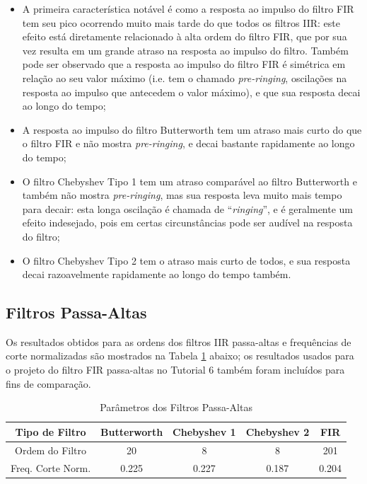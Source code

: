 \documentclass[a4paper,twoside,12pt]{article}
\begin{document}
	\begin{itemize}
		\item A primeira característica notável é como a resposta ao impulso do filtro FIR tem seu pico ocorrendo muito mais tarde do que todos os filtros IIR: este efeito está diretamente relacionado à alta ordem do filtro FIR, que por sua vez resulta em um grande atraso na resposta ao impulso do filtro. Também pode ser observado que a resposta ao impulso do filtro FIR é simétrica em relação ao seu valor máximo (i.e. tem o chamado \emph{pre-ringing}, oscilações na resposta ao impulso que antecedem o valor máximo), e que sua resposta decai ao longo do tempo;
		
		\item A resposta ao impulso do filtro Butterworth tem um atraso mais curto do que o filtro FIR e não mostra \emph{pre-ringing}, e decai bastante rapidamente ao longo do tempo;
		
		\item O filtro Chebyshev Tipo 1 tem um atraso comparável ao filtro Butterworth e também não mostra \emph{pre-ringing}, mas sua resposta leva muito mais tempo para decair: esta longa oscilação é chamada de ``\emph{ringing}'', e é geralmente um efeito indesejado, pois em certas circunstâncias pode ser audível na resposta do filtro;
		
		\item O filtro Chebyshev Tipo 2 tem o atraso mais curto de todos, e sua resposta decai razoavelmente rapidamente ao longo do tempo também.
	\end{itemize}
	
	\subsection{Filtros Passa-Altas}
	
	Os resultados obtidos para as ordens dos filtros IIR passa-altas e frequências de corte normalizadas são mostrados na Tabela \ref{table:IIR_pa_parametros} abaixo; os resultados usados para o projeto do filtro FIR passa-altas no Tutorial 6 também foram incluídos para fins de comparação.
	
	\begin{table}[h!]
		\centering
		\caption{Parâmetros dos Filtros Passa-Altas}
		\begin{tabular}{c|ccc||c}
			\hline
			Tipo de Filtro			& Butterworth	& Chebyshev 1	& Chebyshev 2	& FIR \\
			\hline
			Ordem do Filtro			& 20			& 8				& 8				& 201 \\
			Freq. Corte Norm.		& 0.225			& 0.227			& 0.187			& 0.204 \\
			\hline
		\end{tabular}
		\label{table:IIR_pa_parametros}
	\end{table}
	
\end{document}
